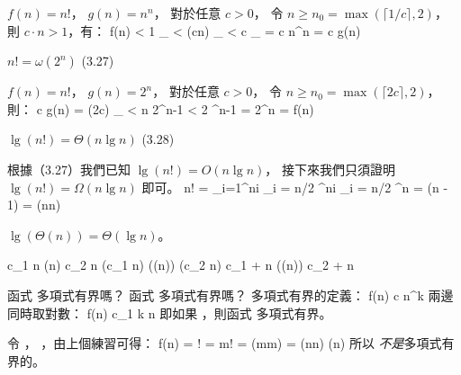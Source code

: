 \startANSWER
$f(n)=n!$， $g(n)=n^n$，
對於任意 $c>0$，
令 $n \ge n_0 = \max(\lceil 1/c\rceil, 2)$，
則 $c\cdot n > 1$，有：
\startformula\startmathalignment
{}\le f(n) \NC
< 1 \cdot {}_{} \NR
\NC \NC < (c\cdot n) \cdot {}_{} \NR
\NC \NC < c \cdot {}_{} \NR
\NC \NC = c n^n \NR
\NC \NC = c g(n) \NR
\stopmathalignment\stopformula
\stopANSWER

\startitem
$n!=\omega(2^n)$ \hfill (3.27)
\stopitem

\startANSWER
$f(n)=n!$， $g(n)=2^n$，
對於任意 $c>0$，
令 $n \ge n_0 = \max(\lceil 2c \rceil, 2)$，
則：
\startformula\startmathalignment
{} \le c g(n) \NC
= (2c) \cdot {}_{} \NR
\NC \NC < n 2^{n-1} \NR
\NC \NC < 2 ^{n-1} \NR
\NC \NC = 2^n \NR
\NC \NC = f(n) \NR
\stopmathalignment\stopformula
\stopANSWER

\startitem
$\lg(n!)=\Theta(n\lg n)$ \hfill (3.28)
\stopitem

\startANSWER
根據（3.27）我們已知 $\lg(n!)=O(n\lg n)$，
接下來我們只須證明 $\lg(n!)=\Omega(n\lg n)$ 即可。
\startformula\startmathalignment
\NC \lg n! \NC = \sum_{i=1}^{n}\lg i \NR
\NC \NC \ge \sum_{i = \lceil n/2 \rceil}^{n}\lg i \NR
\NC \NC \ge \sum_{i = \lceil n/2 \rceil}^{n} \lg {} \NR
\NC \NC \ge {}\lg {} \NR
\NC \NC = (\lg n - 1) \NR
\NC \NC = \Omega(n\lg n) \NR
\stopmathalignment\stopformula
\stopANSWER
\stopitem

\startitem
$\lg(\Theta(n)) = \Theta(\lg n)$。
\stopitem

\startANSWER
\startformula\startmathalignment[n=3,align={right,middle,left}]
\NC c_1 n \le \NC \Theta(n) \NC \le c_2 n \NR
\NC \lg(c_1 n) \le \NC \lg(\Theta(n)) \NC \le \lg(c_2 n) \NR
\NC \lg c_1 + \lg n \le \NC \lg(\Theta(n)) \NC \le \lg c_2 + \lg n \NR
\stopmathalignment\stopformula
\stopANSWER

\stopigBase
\stopEXERCISE

\startEXERCISE\DIFFICULT
函式  多項式有界嗎？
函式  多項式有界嗎？
\stopEXERCISE
\startANSWER
多項式有界的定義：
\startformula
 f(n) \leq c n^k
\stopformula
兩邊同時取對數：
\startformula
 \lg f(n) \leq c_1 k \lg n
\stopformula
即如果 ，則函式  多項式有界。

令 ， ，由上個練習可得：
\startformula\startalign
 \NC \lg f(n) \NC = \lg \lceil{}\rceil ! \NR
 \NC          \NC = \lg m! \NR
 \NC          \NC = \Theta(m\lg m) \NR
 \NC          \NC = \Theta(\lceil\lg n\rceil \lg \lceil \lg n\rceil) \NR
 \NC          \NC \neq \Theta(\lg n) \NR
\stopalign\stopformula
所以  \emph{不是}多項式有界的。

